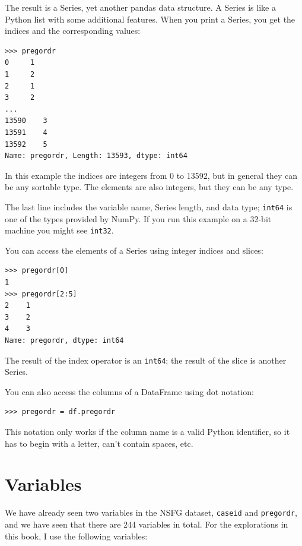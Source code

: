 \documentclass[12pt]{book}
\begin{document}
The result is a Series, yet another pandas data structure.
A Series is like a Python list with some additional features.
When you print a Series, you get the indices and the
corresponding values:

\begin{verbatim}
>>> pregordr
0     1
1     2
2     1
3     2
...
13590    3
13591    4
13592    5
Name: pregordr, Length: 13593, dtype: int64
\end{verbatim}

In this example the indices are integers from 0 to 13592, but in
general they can be any sortable type.  The elements
are also integers, but they can be any type.

The last line includes the variable name, Series length, and data type;
{\tt int64} is one of the types provided by NumPy.  If you run
this example on a 32-bit machine you might see {\tt int32}.

You can access the elements of a Series using integer indices
and slices:

\begin{verbatim}
>>> pregordr[0]
1
>>> pregordr[2:5]
2    1
3    2
4    3
Name: pregordr, dtype: int64
\end{verbatim}

The result of the index operator is an {\tt int64}; the
result of the slice is another Series.

You can also access the columns of a DataFrame using dot notation:

\begin{verbatim}
>>> pregordr = df.pregordr
\end{verbatim}

This notation only works if the column name is a valid Python
identifier, so it has to begin with a letter, can't contain spaces, etc.


\section{Variables}

We have already seen two variables in the NSFG dataset, {\tt caseid}
and {\tt pregordr}, and we have seen that there are 244 variables in
total.  For the explorations in this book, I use the following
variables:
\end{document}
